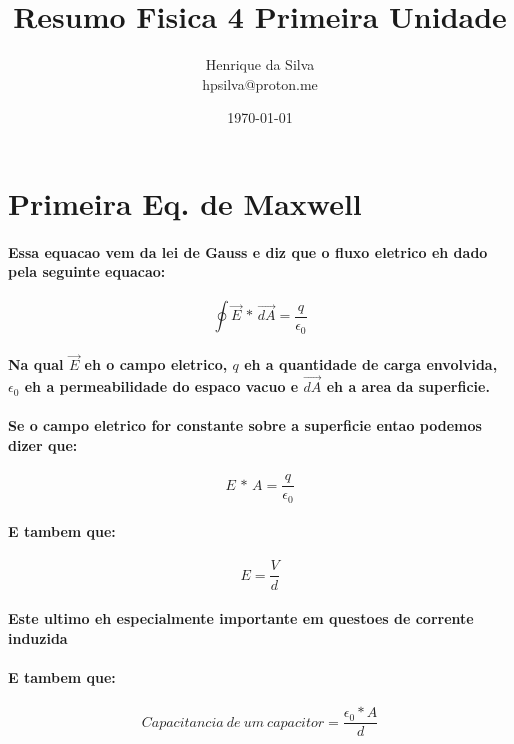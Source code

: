 \documentclass[12pt,twoside, a4paper, twocolumn]{article}
\title{Resumo Fisica 4 Primeira Unidade}
\author{Henrique da Silva \\ hpsilva@proton.me}
\date{\today}
\begin{document}
\maketitle
{}
\newpage
\tableofcontents
\newpage

\newcommand\deriv[2]{\frac{\mathrm d #1}{\mathrm d #2}}

\section{Primeira Eq. de Maxwell}
\paragraph{Essa equacao vem da lei de Gauss e diz que o fluxo eletrico eh dado pela seguinte equacao:
}
\begin{equation}
    \oint \vec{E} \, * \, \vec{dA} = \frac{q}{\epsilon_0}
\end{equation}
\paragraph*{Na qual $\vec{E}$ eh o campo eletrico, $q$ eh a quantidade de carga envolvida, $\epsilon_0$ eh a permeabilidade do espaco vacuo e $\vec{dA}$ eh a area da superficie.}
\paragraph*{Se o campo eletrico for constante sobre a superficie entao podemos dizer que:}
\begin{equation}
    E \, * \, A = \frac{q}{\epsilon_0}
\end{equation}
\paragraph*{E tambem que:}
\begin{equation}
    E = \frac{V}{d}
\end{equation}
\paragraph*{Este ultimo eh especialmente importante em questoes de corrente induzida}
\paragraph*{E tambem que:}
\begin{equation}
    Capacitancia\ de\ um\ capacitor = \frac{\epsilon_0 * A}{d}
\end{equation}
\end{document}
